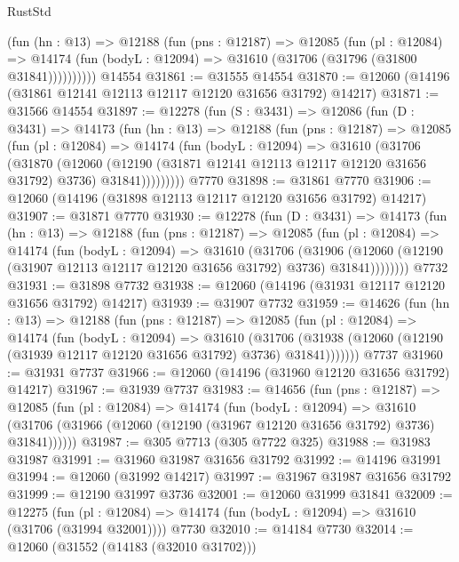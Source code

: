 \begin{lexlean}{RustStd}
\begin{coremodule}
          (fun (hn : @13) =>
          @12188
            (fun (pns : @12187) =>
            @12085
              (fun (pl : @12084) =>
              @14174 (fun (bodyL : @12094) => @31610 (@31706 (@31796 (@31800 @31841))))))))))
    @14554
@31861 := @31555 @14554
@31870 := @12060 (@14196 (@31861 @12141 @12113 @12117 @12120 @31656 @31792) @14217)
@31871 := @31566 @14554
@31897 := @12278
    (fun (S : @3431) =>
    @12086
      (fun (D : @3431) =>
      @14173
        (fun (hn : @13) =>
        @12188
          (fun (pns : @12187) =>
          @12085
            (fun (pl : @12084) =>
            @14174
              (fun (bodyL : @12094) =>
              @31610
                (@31706
                  (@31870
                    (@12060
                      (@12190 (@31871 @12141 @12113 @12117 @12120 @31656 @31792) @3736)
                      @31841)))))))))
    @7770
@31898 := @31861 @7770
@31906 := @12060 (@14196 (@31898 @12113 @12117 @12120 @31656 @31792) @14217)
@31907 := @31871 @7770
@31930 := @12278
    (fun (D : @3431) =>
    @14173
      (fun (hn : @13) =>
      @12188
        (fun (pns : @12187) =>
        @12085
          (fun (pl : @12084) =>
          @14174
            (fun (bodyL : @12094) =>
            @31610
              (@31706
                (@31906
                  (@12060 (@12190 (@31907 @12113 @12117 @12120 @31656 @31792) @3736) @31841))))))))
    @7732
@31931 := @31898 @7732
@31938 := @12060 (@14196 (@31931 @12117 @12120 @31656 @31792) @14217)
@31939 := @31907 @7732
@31959 := @14626
    (fun (hn : @13) =>
    @12188
      (fun (pns : @12187) =>
      @12085
        (fun (pl : @12084) =>
        @14174
          (fun (bodyL : @12094) =>
          @31610
            (@31706
              (@31938 (@12060 (@12190 (@31939 @12117 @12120 @31656 @31792) @3736) @31841)))))))
    @7737
@31960 := @31931 @7737
@31966 := @12060 (@14196 (@31960 @12120 @31656 @31792) @14217)
@31967 := @31939 @7737
@31983 := @14656
    (fun (pns : @12187) =>
    @12085
      (fun (pl : @12084) =>
      @14174
        (fun (bodyL : @12094) =>
        @31610 (@31706 (@31966 (@12060 (@12190 (@31967 @12120 @31656 @31792) @3736) @31841))))))
@31987 := @305 @7713 (@305 @7722 @325)
@31988 := @31983 @31987
@31991 := @31960 @31987 @31656 @31792
@31992 := @14196 @31991
@31994 := @12060 (@31992 @14217)
@31997 := @31967 @31987 @31656 @31792
@31999 := @12190 @31997 @3736
@32001 := @12060 @31999 @31841
@32009 := @12275
    (fun (pl : @12084) => @14174 (fun (bodyL : @12094) => @31610 (@31706 (@31994 @32001))))
    @7730
@32010 := @14184 @7730
@32014 := @12060 (@31552 (@14183 (@32010 @31702)))

\end{coremodule}
\end{lexlean}

